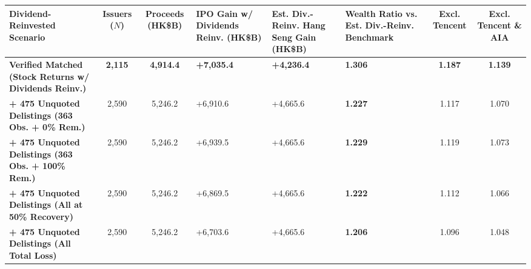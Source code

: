 \documentclass[11pt,letterpaper]{article}
\begin{document}
\begin{table}[!htbp]
\begin{adjustbox}{max width=\textwidth,max totalheight=0.79\textheight}
\begin{minipage}{\textwidth}
\footnotesize
\setlength{\tabcolsep}{3.5pt}
\renewcommand{\arraystretch}{1.18}
\begin{adjustbox}{max width=\textwidth}
\begin{tabular}{>{\raggedright\arraybackslash}p{3.56cm}cc>{\centering\arraybackslash}p{2.36cm}>{\centering\arraybackslash}p{2.56cm}>{\centering\arraybackslash}p{2.82cm}cc}
\toprule
Dividend-Reinvested Scenario & Issuers ($N$) & Proceeds (HK\$B) & IPO Gain w/ Dividends Reinv. (HK\$B) & Est. Div.-Reinv. Hang Seng Gain (HK\$B) & Wealth Ratio vs. Est. Div.-Reinv. Benchmark & Excl. Tencent & Excl. Tencent \& AIA \\
\midrule
\textbf{Verified Matched (Stock Returns w/ Dividends Reinv.)} & \textbf{2,115} & \textbf{4,914.4} & \textbf{+7,035.4} & \textbf{+4,236.4} & \textbf{1.306} & \textbf{1.187} & \textbf{1.139} \\
\textbf{+ 475 Unquoted Delistings (363 Obs. + 0\% Rem.)} & 2,590 & 5,246.2 & +6,910.6 & +4,665.6 & \textbf{1.227} & 1.117 & 1.070 \\
\textbf{+ 475 Unquoted Delistings (363 Obs. + 100\% Rem.)} & 2,590 & 5,246.2 & +6,939.5 & +4,665.6 & \textbf{1.229} & 1.119 & 1.073 \\
\textbf{+ 475 Unquoted Delistings (All at 50\% Recovery)} & 2,590 & 5,246.2 & +6,869.5 & +4,665.6 & \textbf{1.222} & 1.112 & 1.066 \\
\textbf{+ 475 Unquoted Delistings (All Total Loss)} & 2,590 & 5,246.2 & +6,703.6 & +4,665.6 & \textbf{1.206} & 1.096 & 1.048 \\
\bottomrule
\end{tabular}
\end{adjustbox}
\end{minipage}
\end{adjustbox}

\end{table}
\end{document}

